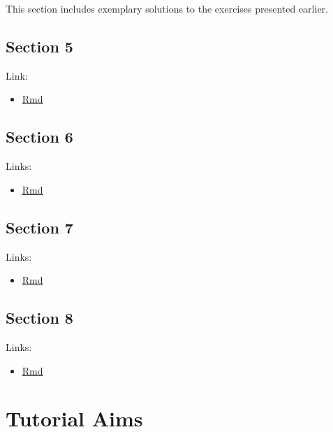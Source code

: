 \documentclass[
  oneside]{book}
\providecommand{\tightlist}{%
  \setlength{\itemsep}{0pt}\setlength{\parskip}{0pt}}
\begin{document}
This section includes exemplary solutions to the exercises presented earlier.

\hypertarget{section-5}{%
\section{Section 5}\label{section-5}}

Link:

\begin{itemize}
\tightlist
\item
  \href{import.Rmd}{Rmd}
\end{itemize}

\hypertarget{section-6}{%
\section{Section 6}\label{section-6}}

Links:

\begin{itemize}
\tightlist
\item
  \href{06-3-ex-sol-ADHD.Rmd}{Rmd}
\end{itemize}

\hypertarget{section-7}{%
\section{Section 7}\label{section-7}}

Links:

\begin{itemize}
\tightlist
\item
  \href{07-3-ex-sol-ADHD.Rmd}{Rmd}
\end{itemize}

\hypertarget{section-8}{%
\section{Section 8}\label{section-8}}

Links:

\begin{itemize}
\tightlist
\item
  \href{08-5-ex-sol-ADHD.Rmd}{Rmd}
\end{itemize}

\hypertarget{tutorial-aims}{%
\chapter{Tutorial Aims}\label{tutorial-aims}}
\end{document}
